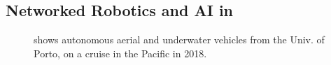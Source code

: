 \subsection{Networked Robotics  and AI  in \proje}

\begin{figure}[!t]
  \centering 
  \hspace{+0.5cm} 
  \caption{ shows autonomous aerial and
    underwater vehicles from the Univ. of Porto, on a cruise in the
    Pacific in 2018.  %
}
\end{figure}
